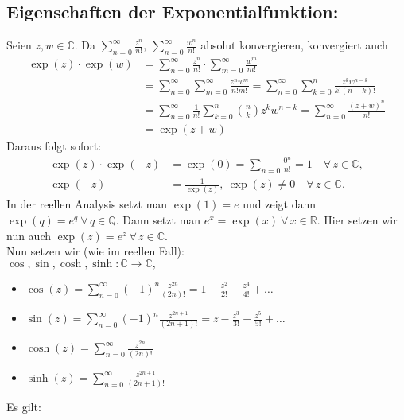 \documentclass[a4paper,12pt]{book}
\theoremstyle{newthm}
\theoremstyle{newdef}
\theoremstyle{newrem}
\newcommand{\Q}{\mathbb{Q}}
\newcommand{\R}{\mathbb{R}}
\newcommand{\C}{\mathbb{C}}
\begin{document}
		\subsection*{Eigenschaften der Exponentialfunktion:}
		Seien $z,w \in \C$. Da $ \sum\limits_{n=0}^\infty \frac{z^n}{n!},\ \sum\limits_{n=0}^\infty \frac{w^n}{n!} $ absolut konvergieren, konvergiert auch
		\begin{align*}
			\exp(z) \cdot \exp(w) &= \sum_{n=0}^\infty \frac{z^n}{n!} \cdot \sum_{m=0}^\infty \frac{w^m}{m!}\\
			&= \sum_{n=0}^\infty \sum_{m=0}^\infty \frac{z^nw^m}{n!m!} = \sum_{n=0}^\infty \sum_{k=0}^n \frac{z^kw^{n-k}}{k!(n-k)!}\\
			&= \sum_{n=0}^\infty \frac{1}{n!} \sum_{k=0}^n \binom{n}{k} z^kw^{n-k} = \sum_{n=0}^\infty \frac{(z+w)^n}{n!}\\
			&= \exp(z+w)
		\end{align*}
		Daraus folgt sofort:
		\begin{align*}
			\exp(z) \cdot \exp(-z) &= \exp(0) = \sum_{n=0} \frac{0^n}{n!} = 1 \quad \forall\, z \in \C,\\
			\exp(-z) &= \frac{1}{\exp(z)},\ \exp(z) \neq 0 \quad \forall\, z \in \C.
		\end{align*}
		In der reellen Analysis setzt man $\exp(1)=e$ und zeigt dann $ \exp(q) = e^q \ \forall\, q \in \Q $. Dann setzt man $ e^x = \exp(x) \ \forall\, x \in \R. $ Hier setzen wir nun auch $ \exp(z) = e^z \ \forall\, z \in \C $.\\
		Nun setzen wir (wie im reellen Fall):\\
		$ \cos,\sin,\cosh,\sinh : \C \to \C, $
		\begin{itemize}
			\item $ \cos(z) = \sum\limits_{n=0}^\infty (-1)^n \frac{z^{2n}}{(2n)!} = 1-\frac{z^2}{2!} + \frac{z^4}{4!} + \dots $
			\item $ \sin(z) = \sum\limits_{n=0}^\infty (-1)^n \frac{z^{2n+1}}{(2n+1)!} = z - \frac{z^3}{3!} + \frac{z^5}{5!} + \dots $
			\item $ \cosh(z) = \sum\limits_{n=0}^\infty \frac{z^{2n}}{(2n)!} $
			\item $ \sinh(z) = \sum\limits_{n=0}^\infty \frac{z^{2n+1}}{(2n+1)!} $
		\end{itemize}
		Es gilt:
\end{document}
